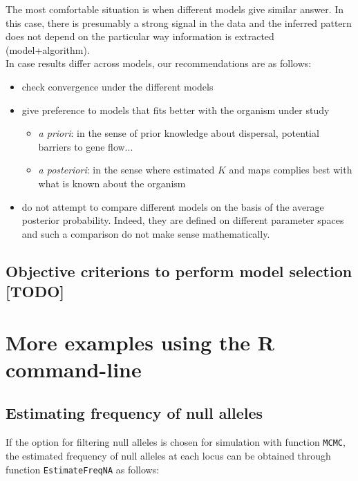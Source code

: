 \documentclass[a4paper,10pt]{article}
\begin{document}
The most comfortable situation is when different models give similar answer. In this case, there is presumably a strong signal in the data 
and the inferred pattern does not depend on the particular way information is extracted (model+algorithm). \\
In case results differ across models, our recommendations are as follows:
\begin{itemize}
\item check convergence under the different models
\item give preference to models that fits better with the organism under study
  \begin{itemize}
  \item {\em a priori}: in the sense of prior knowledge about dispersal, potential barriers to gene flow...
  \item {\em a posteriori}: in the sense where estimated $K$ and maps complies best with what is known about the organism
  \end{itemize}
\item do not attempt to compare different models  on the basis of the average posterior probability. 
Indeed, they are defined on different parameter spaces and such a comparison do not make sense mathematically. 
\end{itemize}


\subsection{Objective criterions to perform model selection [TODO] }



\clearpage
\section[Command line examples]{More examples using the R command-line}\label{sec:more_example}


\subsection[Null alleles]{Estimating frequency of null alleles}

If the option for filtering null alleles is chosen for simulation with function \texttt{MCMC}, the estimated frequency of null alleles at each locus 
can be obtained through function \texttt{EstimateFreqNA} as follows:
\end{document}
